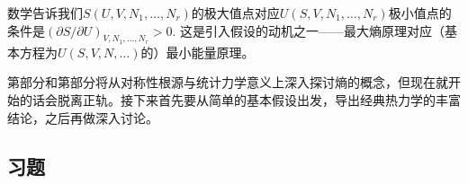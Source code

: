 数学告诉我们$S(U, V, N_1, \dots, N_r)$的极大值点对应$U(S, V, N_1, \dots, N_r)$极小值点的条件是$(\partial S/\partial U)_{V, N_1, \dots, N_r} > 0$. 这是引入假设\uppercase\expandafter{}的动机之一——最大熵原理对应（基本方程为$U(S, V, N, \dots)$的）最小能量原理。

第\uppercase\expandafter{}部分和第\uppercase\expandafter{}部分将从对称性根源与统计力学意义上深入探讨熵的概念，但现在就开始的话会脱离正轨。接下来首先要从简单的基本假设出发，导出经典热力学的丰富结论，之后再做深入讨论。


\subsection*{习题}


